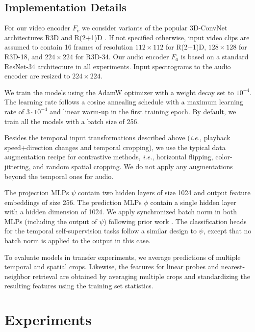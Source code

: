 \documentclass[letterpaper]{article}
\newcommand{\ie}{\emph{i.e.}}
\begin{document}
\subsection{Implementation Details}

For our video encoder $F_v$ we consider variants of the popular 3D-ConvNet architectures R3D \cite{hara2018can} and R(2+1)D \cite{tran2018closer}.
If not specified otherwise, input video clips are assumed to contain 16 frames of resolution $112\times112$ for R(2+1)D, $128\times128$ for R3D-18,  and $224\times224$ for R3D-34.
Our audio encoder $F_a$ is based on a standard ResNet-34 \cite{he2016deep} architecture in all experiments.
Input spectrograms to the audio encoder are resized to $224\times224$.

We train the models using the AdamW optimizer \cite{loshchilov2018decoupled} with a weight decay set to $10^{-4}$.
The learning rate follows a cosine annealing schedule \cite{loshchilov2016sgdr} with a maximum learning rate of $3\cdot10^{-4}$ and linear warm-up in the first training epoch.
By default, we train all the models with a batch size of 256.

Besides the temporal input transformations described above (\ie, playback speed+direction changes and temporal cropping), we use the typical data augmentation recipe for contrastive methods, \ie, horizontal flipping, color-jittering, and random spatial cropping.
We do not apply any augmentations beyond the temporal ones for audio.

The projection MLPs $\psi$ contain two hidden layers of size 1024 and output feature embeddings of size 256.
The prediction MLPs $\phi$ contain a single hidden layer with a hidden dimension of 1024.
We apply synchronized batch norm in both MLPs (including the output of $\psi$) following prior work \cite{chen2020simple}.
The classification heads for the temporal self-supervision tasks follow a similar design to $\psi$, except that no batch norm is applied to the output in this case.

To evaluate models in transfer experiments, we average predictions of multiple temporal and spatial crops.
Likewise, the features for linear probes and nearest-neighbor retrieval are obtained by averaging multiple crops and standardizing the resulting features using the training set statistics.




\section{Experiments}
\end{document}
